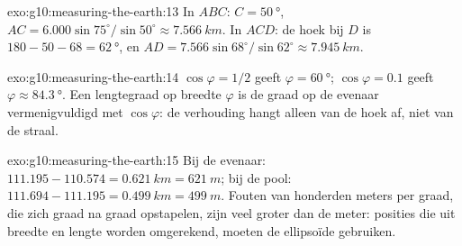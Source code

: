 \begin{solution}{exo:g10:measuring-the-earth:13}
In $ABC$: $C = \qty{50}{\degree}$, $AC = 6.000 \sin 75^\circ/\sin 50^\circ
\approx \qty{7.566}{km}$. In $ACD$: de hoek bij $D$ is $180 - 50 - 68 =
\qty{62}{\degree}$, en $AD = 7.566 \sin 68^\circ/\sin 62^\circ \approx
\qty{7.945}{km}$.
\end{solution}

\begin{solution}{exo:g10:measuring-the-earth:14}
$\cos\varphi = 1/2$ geeft $\varphi = \qty{60}{\degree}$; $\cos\varphi = 0.1$
geeft $\varphi \approx \qty{84.3}{\degree}$. Een lengtegraad op breedte
$\varphi$ is de graad op de evenaar vermenigvuldigd met $\cos\varphi$: de
verhouding hangt alleen van de hoek af, niet van de straal.
\end{solution}

\begin{solution}{exo:g10:measuring-the-earth:15}
Bij de evenaar: $111.195 - 110.574 = \qty{0.621}{km} = \qty{621}{m}$; bij de
pool: $111.694 - 111.195 = \qty{0.499}{km} = \qty{499}{m}$. Fouten van
honderden meters per graad, die zich graad na graad opstapelen, zijn veel groter
dan de meter: posities die uit breedte en lengte worden omgerekend, moeten de
ellipsoïde gebruiken.
\end{solution}

